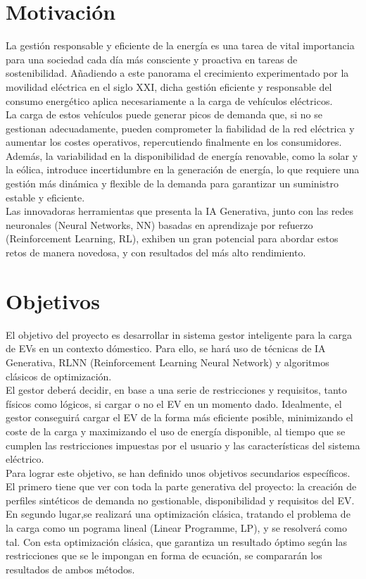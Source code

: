 \section{Motivación}
La gestión responsable y eficiente de la energía es una tarea de vital importancia para una 
sociedad cada día más consciente y proactiva en tareas de sostenibilidad. Añadiendo a este panorama
el crecimiento experimentado por la movilidad eléctrica en el siglo XXI, dicha gestión eficiente y 
responsable del consumo energético aplica necesariamente a la carga de vehículos eléctricos.\\

La carga de estos vehículos puede generar picos de demanda que, si no se gestionan adecuadamente, 
pueden comprometer la fiabilidad de la red eléctrica y aumentar los costes operativos, 
repercutiendo finalmente en los consumidores. Además, la variabilidad en la disponibilidad de 
energía renovable, como la solar y la eólica, introduce incertidumbre en la generación de energía, 
lo que requiere una gestión más dinámica y flexible de la demanda para garantizar un suministro 
estable y eficiente.\\

Las innovadoras herramientas que presenta la IA Generativa, junto con las redes neuronales 
(Neural Networks, NN) basadas en aprendizaje por refuerzo (Reinforcement Learning, RL), exhiben 
un gran potencial para abordar estos retos de manera novedosa, y con resultados del más alto 
rendimiento.

\section{Objetivos}
El objetivo del proyecto es desarrollar in sistema gestor inteligente para la carga de EVs en un 
contexto dómestico. Para ello, se hará uso de técnicas de IA Generativa, RLNN (Reinforcement 
Learning Neural Network) y algoritmos clásicos de optimización.\\

El gestor deberá decidir, en base a una serie de restricciones y requisitos, tanto físicos como 
lógicos, si cargar o no el EV en un momento dado. Idealmente, el gestor conseguirá cargar el EV 
de la forma más eficiente posible, minimizando el coste de la carga y maximizando el uso de energía
disponible, al tiempo que se cumplen las restricciones impuestas por el usuario y las 
características del sistema eléctrico.\\

Para lograr este objetivo, se han definido unos objetivos secundarios específicos. El primero tiene
que ver con toda la parte generativa del proyecto: la creación de perfiles sintéticos de demanda no
gestionable, disponibilidad y requisitos del EV. En segundo lugar,se realizará una optimización 
clásica, tratando el problema de la carga como un pograma lineal (Linear Programme, LP), y se 
resolverá como tal. Con esta optimización clásica, que garantiza un resultado óptimo según las 
restricciones que se le impongan en forma de ecuación, se compararán los resultados de ambos 
métodos.\\

